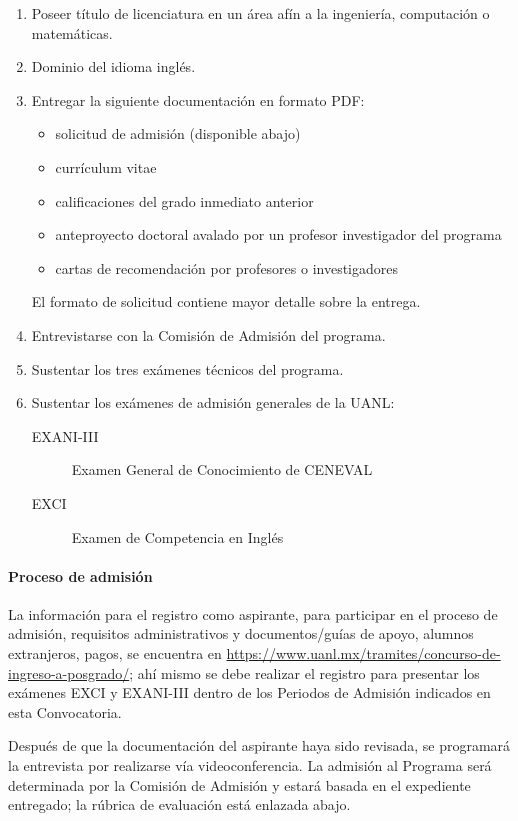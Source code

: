 \documentclass[a0]{sciposter}
\begin{document}
\begin{multicols}{2}
\begin{enumerate}
\item{Poseer título de licenciatura en un área afín a la ingeniería,
computación o matemáticas.}
\item{Dominio del idioma inglés.}
\item{Entregar la siguiente documentación en formato PDF:
  \begin{itemize}
  \item{solicitud de admisión (disponible abajo)}
  \item{currículum vitae}
  \item{calificaciones del grado inmediato anterior}
  \item{anteproyecto doctoral avalado por un profesor investigador
    del programa}
  \item{cartas de recomendación por profesores o investigadores}
  \end{itemize}
  El formato de solicitud contiene mayor detalle sobre la
  entrega.}
\item{Entrevistarse con la Comisión de Admisión del programa.}
\item{Sustentar los tres exámenes técnicos del programa.}
\item{Sustentar los exámenes de admisión generales de la UANL:
  \begin{description}
  \item[EXANI-III]{Examen General de Conocimiento de CENEVAL}
  \item[EXCI]{Examen de Competencia en Inglés}
  \end{description}}
\end{enumerate}

\paragraph{Proceso de admisión}

La información para el registro como aspirante, para participar en el
proceso de admisión, requisitos administrativos y documentos/guías de
apoyo, alumnos extranjeros, pagos, se encuentra en
\url{https://www.uanl.mx/tramites/concurso-de-ingreso-a-posgrado/};
ahí mismo se debe realizar el registro para presentar los exámenes
EXCI y EXANI-III dentro de los Periodos de Admisión indicados en esta
Convocatoria.

Después de que la documentación del aspirante haya sido revisada, se
programará la entrevista por realizarse vía videoconferencia. La
admisión al Programa será determinada por la Comisión de Admisión y
estará basada en el expediente entregado; la rúbrica de evaluación
está enlazada abajo.


\end{multicols}
\end{document}
